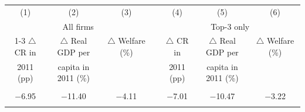 \begin{tabular}{ccc c ccc}
\toprule
(1) & (2) & (3) & & (4) & (5) & (6)\\
\multicolumn{3}{c}{All firms} & & \multicolumn{3}{c}{Top-3 only} \\
\cline{1-3} \cline{5-7}
$\triangle$ CR in & $\triangle$ Real GDP per & $\triangle$ Welfare (\%) & & $\triangle$ CR in & $\triangle$ Real GDP per & $\triangle$ Welfare (\%) \\
2011 (pp) & capita in 2011 (\%) & & & 2011 (pp) & capita in 2011 (\%) & \\
& & & & & & \\
$-$6.95 & $-$11.40 & $-$4.11 & & $-$7.01 & $-$10.47 & $-$3.22 \\
& & & & & & \\
\bottomrule
\end{tabular}
